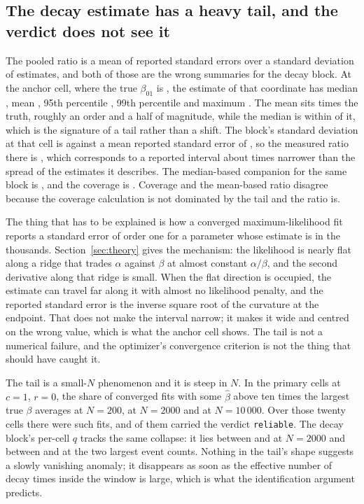 \subsection{The decay estimate has a heavy tail, and the verdict does not see it}
\label{sec:tail}

The pooled ratio is a mean of reported standard errors over a standard deviation of
estimates, and both of those are the wrong summaries for the decay block. At the
anchor cell, where the true $\beta_{01}$ is \ThBetaTruth{}, the estimate of that
coordinate has median \ThBetaMedian{}, mean \ThBetaMean{}, 95th percentile
\ThBetaPninetyfive{}, 99th percentile \ThBetaPninetynine{} and maximum
\ThBetaMax{}. The mean sits \ThBetaMeanOverTruth{} times the truth, roughly an order
and a half of magnitude, while the median is within \ThBetaMedianRelErr{} of it,
which is the signature of a tail rather than a shift. The block's standard deviation
at that cell is \ThAnchorBetaSd{} against a mean reported standard error of
\ThAnchorBetaMse{}, so the measured ratio there is \ThAnchorBetaQ{}, which
corresponds to a reported interval about \ThAnchorBetaGap{} times narrower than the
spread of the estimates it describes. The median-based companion for the same block
is \ThAnchorBetaQrob{}, and the coverage is \ThAnchorBetaCov{}. Coverage and the
mean-based ratio disagree because the coverage calculation is not dominated by the
tail and the ratio is.

The thing that has to be explained is how a converged maximum-likelihood fit reports
a standard error of order one for a parameter whose estimate is in the thousands.
Section~\ref{sec:theory} gives the mechanism: the likelihood is nearly flat along a
ridge that trades $\alpha$ against $\beta$ at almost constant $\alpha/\beta$, and
the second derivative along that ridge is small. When the flat direction is
occupied, the estimate can travel far along it with almost no likelihood penalty,
and the reported standard error is the inverse square root of the curvature at the
endpoint. That does not make the interval narrow; it makes it wide and centred on
the wrong value, which is what the anchor cell shows. The tail is not a numerical
failure, and the optimizer's convergence criterion is not the thing that should
have caught it.

The tail is a small-$N$ phenomenon and it is steep in $N$. In the primary cells at
$c = 1$, $r = 0$, the share of converged fits with some $\hat\beta$ above ten times
the largest true $\beta$ averages \ThTailNtwohundred{} at $N = 200$,
\ThTailNtwothousand{} at $N = 2000$ and \ThTailNtenthousand{} at $N = 10\,000$. Over
those twenty cells there were \ThTailFits{} such fits, and \ThTailReliable{} of them
carried the verdict \texttt{reliable}. The decay block's per-cell $q$ tracks the
same collapse: it lies between \ThBetaQSmallLow{} and \ThBetaQSmallHigh{} at
$N = 2000$ and between \ThBetaQLargeLow{} and \ThBetaQLargeHigh{} at the two largest
event counts. Nothing in the tail's shape suggests a slowly vanishing anomaly; it
disappears as soon as the effective number of decay times inside the window is
large, which is what the identification argument predicts.

